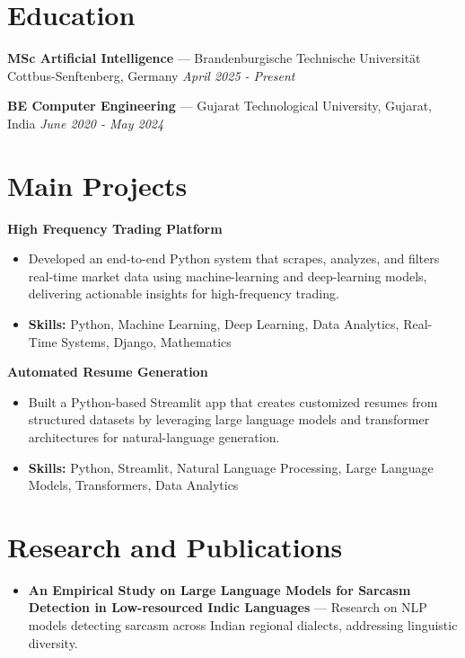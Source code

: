 \documentclass[a4paper,10pt]{article}
\begin{document}
\section*{Education}
\textbf{MSc Artificial Intelligence} — Brandenburgische Technische Universität Cottbus-Senftenberg, Germany \hfill \textit{April 2025 - Present}\par
\vspace{1.5pt}
\textbf{BE Computer Engineering} — Gujarat Technological University, Gujarat, India \hfill \textit{June 2020 - May 2024}\par

\section*{Main Projects}
\textbf{High Frequency Trading Platform}\par
\vspace{1pt}
\begin{itemize}
  \item Developed an end-to-end Python system that scrapes, analyzes, and filters real-time market data using machine-learning and deep-learning models, delivering actionable insights for high-frequency trading.
  \item \textbf{Skills:} Python, Machine Learning, Deep Learning, Data Analytics, Real-Time Systems, Django, Mathematics
\end{itemize}
\vspace{3pt}
\textbf{Automated Resume Generation}\par
\vspace{1pt}
\begin{itemize}
  \item Built a Python-based Streamlit app that creates customized resumes from structured datasets by leveraging large language models and transformer architectures for natural-language generation.
  \item \textbf{Skills:} Python, Streamlit, Natural Language Processing, Large Language Models, Transformers, Data Analytics
\end{itemize}

\section*{Research and Publications}
\begin{itemize}
\item \textbf{An Empirical Study on Large Language Models for Sarcasm Detection in Low-resourced Indic Languages} — Research on NLP models detecting sarcasm across Indian regional dialects, addressing linguistic diversity.
\end{itemize}
\end{document}
